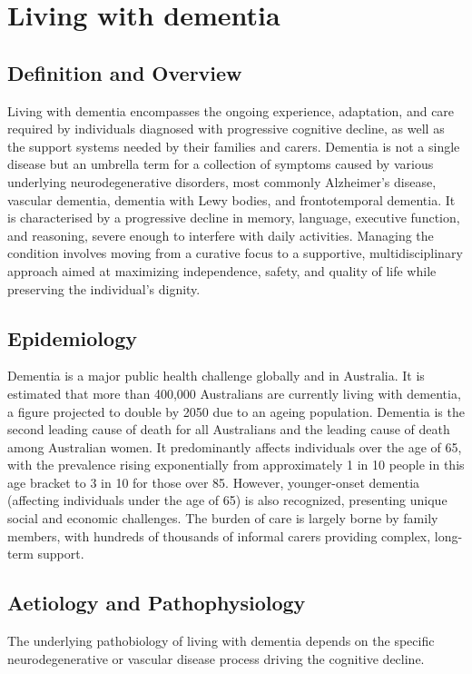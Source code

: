 \chapter{Living with dementia}

\section*{Definition and Overview}
Living with dementia encompasses the ongoing experience, adaptation, and care required by individuals diagnosed with progressive cognitive decline, as well as the support systems needed by their families and carers. Dementia is not a single disease but an umbrella term for a collection of symptoms caused by various underlying neurodegenerative disorders, most commonly Alzheimer's disease, vascular dementia, dementia with Lewy bodies, and frontotemporal dementia. It is characterised by a progressive decline in memory, language, executive function, and reasoning, severe enough to interfere with daily activities. Managing the condition involves moving from a curative focus to a supportive, multidisciplinary approach aimed at maximizing independence, safety, and quality of life while preserving the individual's dignity.

\section*{Epidemiology}
Dementia is a major public health challenge globally and in Australia. It is estimated that more than 400,000 Australians are currently living with dementia, a figure projected to double by 2050 due to an ageing population. Dementia is the second leading cause of death for all Australians and the leading cause of death among Australian women. It predominantly affects individuals over the age of 65, with the prevalence rising exponentially from approximately 1 in 10 people in this age bracket to 3 in 10 for those over 85. However, younger-onset dementia (affecting individuals under the age of 65) is also recognized, presenting unique social and economic challenges. The burden of care is largely borne by family members, with hundreds of thousands of informal carers providing complex, long-term support.

\section*{Aetiology and Pathophysiology}
The underlying pathobiology of living with dementia depends on the specific neurodegenerative or vascular disease process driving the cognitive decline.


